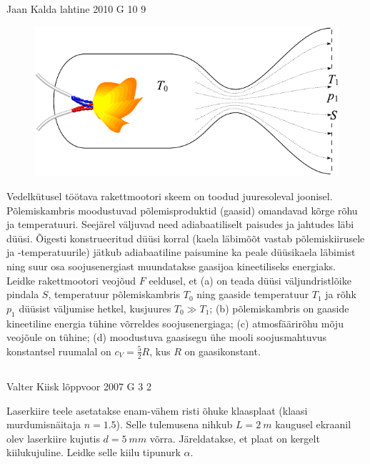 \documentclass[11pt, twoside]{article}
\begin{document}
{%
{Jaan Kalda} %
{lahtine} %
{2010} %
{G 10} %
{9} %
{
\ifStatement
\begin{figure}
	\vspace{-3ex}
	\includegraphics[width=\linewidth]{2010-lahg-10-rakettmootor}
	\vspace{-6ex}
\end{figure}
Vedelkütusel töötava rakettmootori skeem on toodud juuresoleval joonisel. Põlemiskambris moodustuvad põlemisproduktid (gaasid) omandavad kõrge rõhu ja temperatuuri. Seejärel väljuvad need adiabaatiliselt paisudes ja jahtudes läbi düüsi. Õigesti konstrueeritud düüsi korral (kaela läbimõõt vastab põlemiskiirusele ja -temperatuurile) jätkub adiabaatiline paisumine ka peale düüsikaela läbimist ning suur osa soojusenergiast muundatakse gaasijoa kineetiliseks energiaks. Leidke rakettmootori veojõud $F$ eeldusel, et (a) on teada düüsi väljundristlõike pindala $S$, temperatuur põlemiskambris $T_0$ ning gaaside temperatuur $T_1$ ja rõhk $p_1$ düüsist väljumise hetkel, kusjuures $T_0 \gg T_1$; (b) põlemiskambris on gaaside kineetiline energia tühine võrreldes soojusenergiaga; (c) atmosfäärirõhu mõju veojõule on tühine; (d) moodustuva gaasisegu ühe mooli soojusmahtuvus konstantsel ruumalal on $c_V = \frac52 R$, kus $R$ on gaasikonstant.
\fi
}
\newpage\subsection{\protect{}}

{Valter Kiisk} %
{lõppvoor} %
{2007} %
{G 3} %
{2} %
{
\ifStatement
Laserkiire teele asetatakse enam-vähem risti õhuke klaasplaat (klaasi murdumisnäitaja $n = \num{1,5}$). Selle tulemusena nihkub $L = \SI{2}{m}$ kaugusel ekraanil olev laserkiire kujutis $d = \SI{5}{mm}$ võrra. Järeldatakse, et plaat on kergelt kiilukujuline. Leidke selle kiilu tipunurk $\alpha$. 

}}
\end{document}
